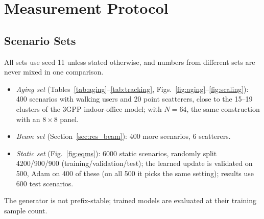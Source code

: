 \section{Measurement Protocol}
\label{sec:method}

\subsection{Scenario Sets}
All sets use seed 11 unless stated otherwise, and numbers from different sets are never mixed in one comparison.
\begin{itemize}
    \item \emph{Aging set} (Tables~\ref{tab:aging}--\ref{tab:tracking}, Figs.~\ref{fig:aging}--\ref{fig:scaling}): 400 scenarios with walking users and 20 point scatterers, close to the 15--19 clusters of the 3GPP indoor-office model; with $N=64$, the same construction with an $8\times 8$ panel.
    \item \emph{Beam set} (Section~\ref{sec:res_beam}): 400 more scenarios, 6 scatterers.
    \item \emph{Static set} (Fig.~\ref{fig:eqms}): 6000 static scenarios, randomly split 4200/900/900 (training/validation/test); the learned update is validated on 500, Adam on 400 of these (on all 500 it picks the same setting); results use 600 test scenarios.
\end{itemize}
The generator is not prefix-stable; trained models are evaluated at their training sample count.

